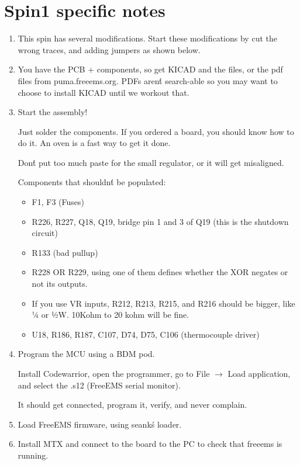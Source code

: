 \section{Spin1 specific notes}

\begin{enumerate}
\item This spin has several modifications. Start these modifications by cut the wrong traces, and adding jumpers as shown below.

\item You have the PCB + components, so get KICAD and the files, or the pdf files from puma.freeems.org. PDFs aren\'t search-able so you may want to choose to install KICAD until we workout that.

\item Start the assembly!

Just solder the components. If you ordered a board, you should know how to do it. An oven is a fast way to get it done.

Don\'t put too much paste for the small regulator, or it will get misaligned.

Components that shouldn\'t be populated:

\begin{itemize}
\item F1, F3 (Fuses)
\item R226, R227, Q18, Q19, bridge pin 1 and 3 of Q19 (this is the shutdown circuit)
\item R133 (bad pullup)
\item R228 OR R229, using one of them defines whether the XOR negates or not its outputs.
\item If you use VR inputs, R212, R213, R215, and R216 should be bigger, like ¼ or ½W. 10Kohm to 20 kohm will be fine.
\item U18, R186, R187, C107, D74, D75, C106 (thermocouple driver)
\end{itemize}

\item Program the MCU using a BDM pod.

Install Codewarrior, open the programmer, go to File $\rightarrow$ Load application, and select the .s12 (FreeEMS serial monitor).

It should get connected, program it, verify, and never complain.

\item Load FreeEMS firmware, using seank\'s loader.

\item Install  MTX and connect to the board to the PC to check that freeems is running.

\end{enumerate}
